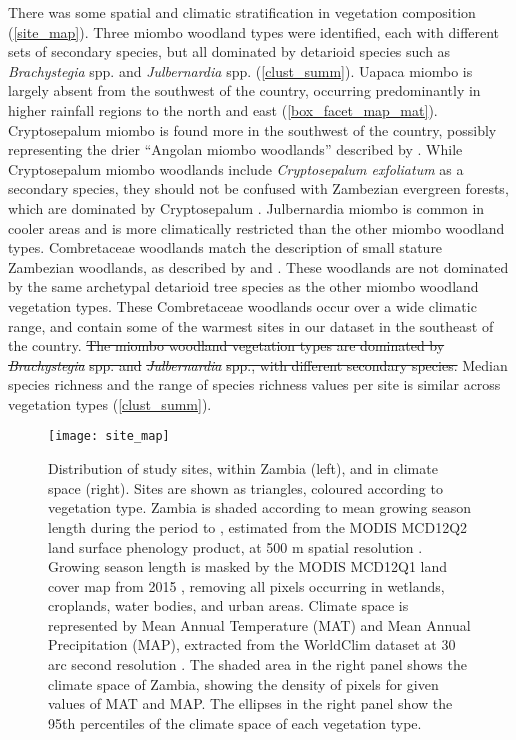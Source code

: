 \documentclass[11pt,a4paper]{article}
\providecommand{\DIFdeltex}[1]{{\protect\color{red}\sout{#1}}}                      %
\providecommand{\DIFdelbegin}{} %
\providecommand{\DIFdelend}{} %
\providecommand{\DIFdel}[1]{\texorpdfstring{\DIFdeltex{#1}}{}} %
\newcommand{\DIFscaledelfig}{0.5}
\newlength{\DIFdelgraphicswidth} %
\newlength{\DIFdelgraphicsheight} %
\newcommand{\DIFdelincludegraphics}[2][]{%
\sbox{\DIFdelgraphicsbox}{\DIFOincludegraphics[#1]{#2}}%
\settoboxwidth{\DIFdelgraphicswidth}{\DIFdelgraphicsbox} %
\settoboxtotalheight{\DIFdelgraphicsheight}{\DIFdelgraphicsbox} %
\scalebox{\DIFscaledelfig}{%
\parbox[b]{\DIFdelgraphicswidth}{\usebox{\DIFdelgraphicsbox}\\[-\baselineskip] \rule{\DIFdelgraphicswidth}{0em}}\llap{\resizebox{\DIFdelgraphicswidth}{\DIFdelgraphicsheight}{%
\setlength{\unitlength}{\DIFdelgraphicswidth}%
\begin{picture}(1,1)%
\thicklines\linethickness{2pt} %
{\color[rgb]{1,0,0}\put(0,0){\framebox(1,1){}}}%
{\color[rgb]{1,0,0}\put(0,0){\line( 1,1){1}}}%
{\color[rgb]{1,0,0}\put(0,1){\line(1,-1){1}}}%
\end{picture}%
}\hspace*{3pt}}} %
} %
\DeclareRobustCommand{\DIFdelbegin}{\DIFOdelbegin \let\includegraphics\DIFdelincludegraphics} %
\DeclareRobustCommand{\DIFdelend}{\DIFOaddend \let\includegraphics\DIFOincludegraphics} %
\begin{document}
There was some spatial and climatic stratification in vegetation composition
(\autoref{site_map}). Three miombo woodland types were identified, each with
different sets of secondary species, but all dominated by detarioid species
such as \textit{Brachystegia} spp. and \textit{Julbernardia} spp.
(\autoref{clust_summ}). Uapaca miombo is largely absent from the southwest of
the country, occurring predominantly in higher rainfall regions to the north
and east (\autoref{box_facet_map_mat}). Cryptosepalum miombo is found more in
the southwest of the country, possibly representing the drier ``Angolan miombo
woodlands'' described by \citet{White1983}. While Cryptosepalum miombo
woodlands include \textit{Cryptosepalum exfoliatum} as a secondary species,
they should not be confused with Zambezian evergreen forests, which are
dominated by Cryptosepalum \citep{White1983}. Julbernardia miombo is common in
cooler areas and is more climatically restricted than the other miombo woodland
types. Combretaceae woodlands match the description of small stature Zambezian
woodlands, as described by \citet{Dinerstein2017} and \citet{Chidumayo2001}.
These woodlands are not dominated by the same archetypal detarioid tree species
as the other miombo woodland vegetation types. These Combretaceae woodlands
occur over a wide climatic range, and contain some of the warmest sites in our
dataset in the southeast of the country. \DIFdelbegin \DIFdel{The miombo woodland vegetation types
are dominated by }\textit{\DIFdel{Brachystegia}} %
\DIFdel{spp. and }\textit{\DIFdel{Julbernardia}} %
\DIFdel{spp.,
with different secondary species. }\DIFdelend Median species richness and the range of
species richness values per site is similar across vegetation types
(\autoref{clust_summ}). 

\begin{figure}[H]
\centering
	\texttt{[image: site\_map]}
	\caption{Distribution of study sites, within Zambia (left), and in climate
		space (right). Sites are shown as triangles, coloured according to
		vegetation type. Zambia is shaded according to mean growing season length
		during the period \modisStart{} to \modisEnd{}, estimated from the MODIS
		MCD12Q2 land surface phenology product, at 500 m spatial resolution
		\citep{MCD12Q2}. Growing season length is masked by the MODIS MCD12Q1 land
		cover map from 2015 \citep{MCD12Q1}, removing all pixels occurring in wetlands,
		croplands, water bodies, and urban areas. Climate space is represented by Mean
		Annual Temperature (MAT) and Mean Annual Precipitation (MAP), extracted from
		the WorldClim dataset at 30 arc second resolution \citep{Fick2017}. The shaded
		area in the right panel shows the climate space of Zambia, showing the density
		of pixels for given values of MAT and MAP. The ellipses in the right panel show
		the 95th percentiles of the climate space of each vegetation type.} 
	\label{site_map}
\end{figure}
\end{document}
